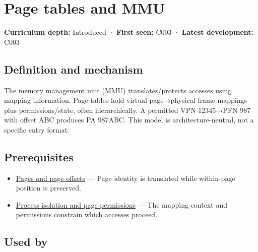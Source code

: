 \hypertarget{appendix-01e5905165c4}{}\label{referencestart:appendix-01e5905165c4}
\section{Page tables and MMU}\label{appendix-01e5905165c4-page-tables-and-mmu}

\hypertarget{appendix-01e5905165c4-page-tables-and-mmu}{}

\textbf{Curriculum depth:} Introduced · \textbf{First seen:} C003 · \textbf{Latest development:} C003

\begin{allmightroledefinition}

\subsection{Definition and mechanism}\label{appendix-01e5905165c4-definition-and-mechanism}

\hypertarget{appendix-01e5905165c4-definition-and-mechanism}{}

The memory management unit (MMU) translates/protects accesses using mapping information. Page tables hold virtual-page→physical-frame mappings plus permissions/state, often hierarchically. A permitted VPN 12345→PFN 987 with offset ABC produces PA 987ABC. This model is architecture-neutral, not a specific entry format.

\end{allmightroledefinition}

\subsection{Prerequisites}\label{appendix-01e5905165c4-prerequisites}

\hypertarget{appendix-01e5905165c4-prerequisites}{}

\begin{itemize}
\tightlist
\item
  \hyperref[appendix-0c67cd5bf30a]{Pages and page offsets} --- Page identity is translated while within-page position is preserved.
\item
  \hyperref[appendix-c2a9ad1e2b49]{Process isolation and page permissions} --- The mapping context and permissions constrain which accesses proceed.
\end{itemize}

\subsection{Used by}\label{appendix-01e5905165c4-used-by}

